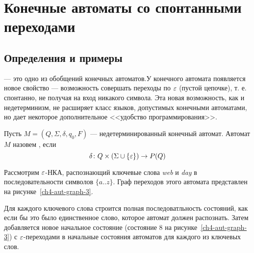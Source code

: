 \chapter{Конечные автоматы со спонтанными переходами}
\label{Chapter4}

\section{Определения и примеры}
\label{Chapter4Defines}

 --- это одно из обобщений конечных автоматов.У 
конечного автомата появляется новое свойство --- возможность совершать 
переходы по $\varepsilon$ (пустой цепочке), т. е. спонтанно, не получая на 
вход никакого символа. Эта новая возможность, как и недетерминизм, не 
расширяет класс языков, допустимых конечными автоматами, но дает 
некоторое дополнительное  <<удобство программирования>>.

Пусть $M = (Q,\Sigma, \delta, q_0, F)$ --- недетерминированный конечный автомат. Автомат $M$
назовем , если
\[
    \delta \colon Q \times (\Sigma \cup \{ \varepsilon \} ) \to P(Q)
\]


\begin{myexample}
Рассмотрим $\varepsilon$-НКА, распознающий ключевые слова \emph{web} и \emph{day} в последовательности символов $\{ a..z \}$. Граф переходов этого автомата представлен на рисунке~\ref{ch4-aut-graph-3}.

Для каждого ключевого слова строится полная последоватльность состояний, как если бы это было единственное слово, которое автомат должен распознать. Затем добавляется новое начальное состояние (состояние 8 на рисунке~\ref{ch4-aut-graph-3}) с $\varepsilon$-переходами в начальные состояния автоматов для каждого из ключевых слов.
\end{myexample}

